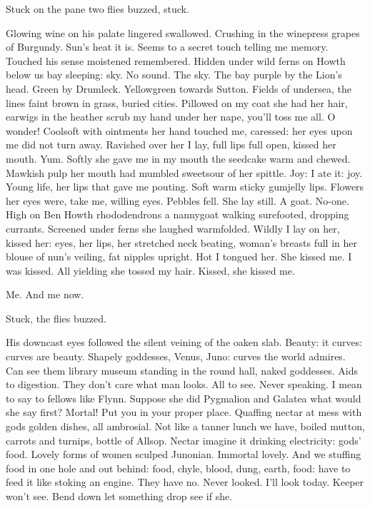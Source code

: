 Stuck on the pane two flies buzzed,
stuck.

Glowing wine on his palate lingered swallowed.
Crushing in the winepress
grapes of Burgundy.
Sun's heat it is.
Seems to a secret touch telling me
memory.
Touched his sense moistened remembered.
Hidden under wild ferns
on Howth below us bay sleeping:
sky.
No sound.
The sky.
The bay purple by
the Lion's head.
Green by Drumleck.
Yellowgreen towards Sutton.
Fields of
undersea,
the lines faint brown in grass,
buried cities.
Pillowed on my
coat she had her hair,
earwigs in the heather scrub my hand under her
nape,
you'll toss me all.
O wonder!
Coolsoft with ointments her hand
touched me,
caressed:
her eyes upon me did not turn away.
Ravished over
her I lay,
full lips full open,
kissed her mouth.
Yum.
Softly she gave me
in my mouth the seedcake warm and chewed.
Mawkish pulp her mouth had
mumbled sweetsour of her spittle.
Joy:
I ate it:
joy.
Young life,
her
lips that gave me pouting.
Soft warm sticky gumjelly lips.
Flowers her
eyes were,
take me,
willing eyes.
Pebbles fell.
She lay still.
A goat.
No-one.
High on Ben Howth rhododendrons a nannygoat walking surefooted,
dropping currants.
Screened under ferns she laughed warmfolded.
Wildly I
lay on her,
kissed her:
eyes,
her lips,
her stretched neck beating,
woman's breasts full in her blouse of nun's veiling,
fat nipples upright.
Hot I tongued her.
She kissed me.
I was kissed.
All yielding she tossed
my hair.
Kissed,
she kissed me.

Me.
And me now.

Stuck,
the flies buzzed.

His downcast eyes followed the silent veining of the oaken slab.
Beauty:
it curves:
curves are beauty.
Shapely goddesses,
Venus,
Juno:
curves the
world admires.
Can see them library museum standing in the round hall,
naked goddesses.
Aids to digestion.
They don't care what man looks.
All
to see.
Never speaking.
I mean to say to fellows like Flynn.
Suppose she
did Pygmalion and Galatea what would she say first?
Mortal!
Put you in
your proper place.
Quaffing nectar at mess with gods golden dishes,
all
ambrosial.
Not like a tanner lunch we have,
boiled mutton,
carrots and
turnips,
bottle of Allsop.
Nectar imagine it drinking electricity:
gods'
food.
Lovely forms of women sculped Junonian.
Immortal lovely.
And we
stuffing food in one hole and out behind:
food,
chyle,
blood,
dung,
earth,
food:
have to feed it like stoking an engine.
They have no.
Never
looked.
I'll look today.
Keeper won't see.
Bend down let something drop
see if she.

